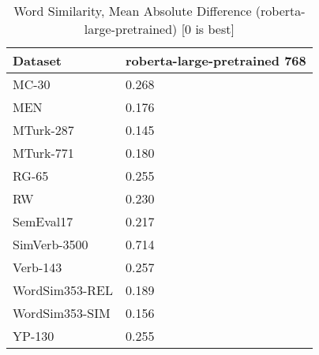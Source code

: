 \begin{table}[]
\centering
\begin{tabular}{l|l}
\hline
Dataset & roberta-large-pretrained 768 \\
\hline
MC-30 & 0.268 \\ 
MEN & 0.176 \\ 
MTurk-287 & 0.145 \\ 
MTurk-771 & 0.180 \\ 
RG-65 & 0.255 \\ 
RW & 0.230 \\ 
SemEval17 & 0.217 \\ 
SimVerb-3500 & 0.714 \\ 
Verb-143 & 0.257 \\ 
WordSim353-REL & 0.189 \\ 
WordSim353-SIM & 0.156 \\ 
YP-130 & 0.255
\end{tabular}
\caption{Word Similarity, Mean Absolute Difference (roberta-large-pretrained) [0 is best]}
\label{tab:similarity-roberta-large-pretrained}
\end{table}
